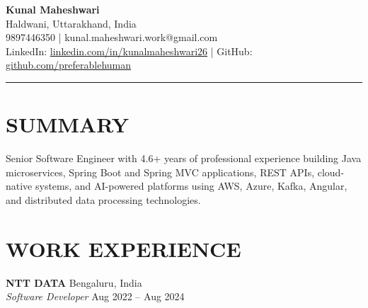 \documentclass[12pt]{article}
\begin{document}
{\LARGE \textbf{Kunal Maheshwari}} \\
Haldwani, Uttarakhand, India \\
9897446350 | kunal.maheshwari.work@gmail.com \\
LinkedIn: \href{https://www.linkedin.com/in/kunalmaheshwari26}{linkedin.com/in/kunalmaheshwari26} | 
GitHub: \href{https://github.com/preferablehuman}{github.com/preferablehuman}

\vspace{4pt}
\hrule
\vspace{4pt}

\section*{SUMMARY}
Senior Software Engineer with 4.6+ years of professional experience building Java microservices, Spring Boot and Spring MVC applications, REST APIs, cloud-native systems, and AI-powered platforms using AWS, Azure, Kafka, Angular, and distributed data processing technologies.
\section*{WORK EXPERIENCE}

\textbf{NTT DATA} \hfill Bengaluru, India \\
\textit{Software Developer} \hfill Aug 2022 -- Aug 2024
\end{document}
